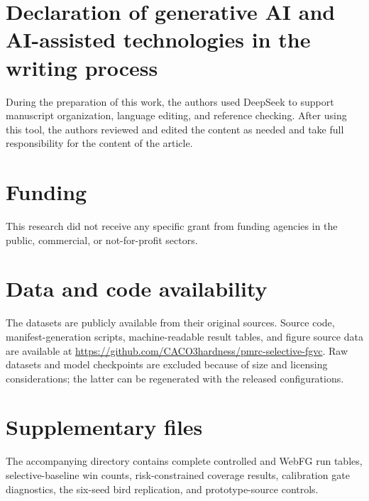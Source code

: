 \documentclass[review,times]{elsarticle}
\begin{document}
\section*{Declaration of generative AI and AI-assisted technologies in the writing process}
During the preparation of this work, the authors used DeepSeek to support
manuscript organization, language editing, and reference checking.
After using this tool, the authors reviewed and edited the content as needed
and take full responsibility for the content of the article.

\section*{Funding}
This research did not receive any specific grant from funding agencies in the
public, commercial, or not-for-profit sectors.

\section*{Data and code availability}
The datasets are publicly available from their original sources. Source code,
manifest-generation scripts, machine-readable result tables, and figure source
data are available at
{\small\url{https://github.com/CACO3hardness/pmrc-selective-fgvc}}.
Raw datasets and model checkpoints are excluded because of size and licensing
considerations; the latter can be regenerated with the released configurations.

\section*{Supplementary files}
The accompanying directory contains complete controlled and WebFG run tables,
selective-baseline win counts, risk-constrained coverage results, calibration
gate diagnostics, the six-seed bird replication, and prototype-source controls.

\clearpage
{\footnotesize


}
\end{document}
